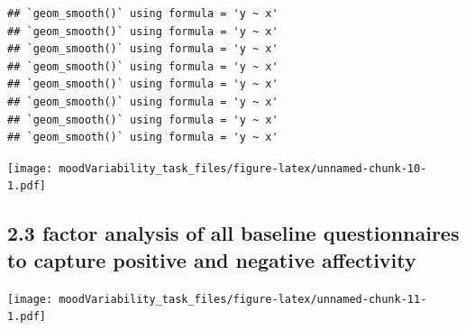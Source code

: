 \documentclass[
]{article}
\newenvironment{Shaded}{\begin{snugshade}}{\end{snugshade}}
\newcommand{\AttributeTok}[1]{\textcolor[rgb]{0.13,0.29,0.53}{#1}}
\newcommand{\CommentTok}[1]{\textcolor[rgb]{0.56,0.35,0.01}{\textit{#1}}}
\newcommand{\DecValTok}[1]{\textcolor[rgb]{0.00,0.00,0.81}{#1}}
\newcommand{\FunctionTok}[1]{\textcolor[rgb]{0.13,0.29,0.53}{\textbf{#1}}}
\newcommand{\NormalTok}[1]{#1}
\newcommand{\OtherTok}[1]{\textcolor[rgb]{0.56,0.35,0.01}{#1}}
\newcommand{\SpecialCharTok}[1]{\textcolor[rgb]{0.81,0.36,0.00}{\textbf{#1}}}
\begin{document}
\begin{verbatim}
## `geom_smooth()` using formula = 'y ~ x'
## `geom_smooth()` using formula = 'y ~ x'
## `geom_smooth()` using formula = 'y ~ x'
## `geom_smooth()` using formula = 'y ~ x'
## `geom_smooth()` using formula = 'y ~ x'
## `geom_smooth()` using formula = 'y ~ x'
## `geom_smooth()` using formula = 'y ~ x'
## `geom_smooth()` using formula = 'y ~ x'
\end{verbatim}

\texttt{[image: moodVariability\_task\_files/figure-latex/unnamed-chunk-10-1.pdf]}

\hypertarget{factor-analysis-of-all-baseline-questionnaires-to-capture-positive-and-negative-affectivity}{%
\subsection{2.3 factor analysis of all baseline questionnaires to
capture positive and negative
affectivity}\label{factor-analysis-of-all-baseline-questionnaires-to-capture-positive-and-negative-affectivity}}

\begin{Shaded}
\end{Shaded}

\texttt{[image: moodVariability\_task\_files/figure-latex/unnamed-chunk-11-1.pdf]}
\end{document}
